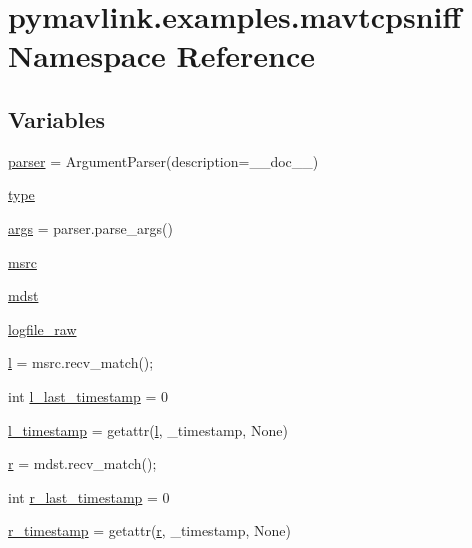 \hypertarget{namespacepymavlink_1_1examples_1_1mavtcpsniff}{}\section{pymavlink.\+examples.\+mavtcpsniff Namespace Reference}
\label{namespacepymavlink_1_1examples_1_1mavtcpsniff}
\subsection*{Variables}
\begin{DoxyCompactItemize}
\item 
\mbox{\hyperlink{namespacepymavlink_1_1examples_1_1mavtcpsniff_ad940e3269568b6625c9ab6ee1759ff71}{parser}} = Argument\+Parser(description=\+\_\+\+\_\+doc\+\_\+\+\_\+)
\item 
\mbox{\hyperlink{namespacepymavlink_1_1examples_1_1mavtcpsniff_ae675c6bc45c6b431a36251a691509f5e}{type}}
\item 
\mbox{\hyperlink{namespacepymavlink_1_1examples_1_1mavtcpsniff_a0ad33c6c70d40c78cfbcb6da67f6fe89}{args}} = parser.\+parse\+\_\+args()
\item 
\mbox{\hyperlink{namespacepymavlink_1_1examples_1_1mavtcpsniff_ac9d50620364a4c08daadfe49a1acbb0d}{msrc}}
\item 
\mbox{\hyperlink{namespacepymavlink_1_1examples_1_1mavtcpsniff_a7574d37d3c8cf95c5f4833e889b5bc82}{mdst}}
\item 
\mbox{\hyperlink{namespacepymavlink_1_1examples_1_1mavtcpsniff_aeb3d6543641bd44719e19f2fdd3badc0}{logfile\+\_\+raw}}
\item 
\mbox{\hyperlink{namespacepymavlink_1_1examples_1_1mavtcpsniff_a310417b77149af2ebfa7d55cdfebce43}{l}} = msrc.\+recv\+\_\+match();
\item 
int \mbox{\hyperlink{namespacepymavlink_1_1examples_1_1mavtcpsniff_a2d1e873c3fd312f8dddb019f9099e0dd}{l\+\_\+last\+\_\+timestamp}} = 0
\item 
\mbox{\hyperlink{namespacepymavlink_1_1examples_1_1mavtcpsniff_ae6dab03b22f9c8b60bcd8eda49c01aee}{l\+\_\+timestamp}} = getattr(\mbox{\hyperlink{namespacepymavlink_1_1examples_1_1mavtcpsniff_a310417b77149af2ebfa7d55cdfebce43}{l}}, \textquotesingle{}\+\_\+timestamp\textquotesingle{}, None)
\item 
\mbox{\hyperlink{namespacepymavlink_1_1examples_1_1mavtcpsniff_ac95233adb6f5bcb5198de3ac5149983a}{r}} = mdst.\+recv\+\_\+match();
\item 
int \mbox{\hyperlink{namespacepymavlink_1_1examples_1_1mavtcpsniff_ae9c1681b1baa25c1396eb5504141c086}{r\+\_\+last\+\_\+timestamp}} = 0
\item 
\mbox{\hyperlink{namespacepymavlink_1_1examples_1_1mavtcpsniff_ae2380478b63eddb15d96696d8e664ba1}{r\+\_\+timestamp}} = getattr(\mbox{\hyperlink{namespacepymavlink_1_1examples_1_1mavtcpsniff_ac95233adb6f5bcb5198de3ac5149983a}{r}}, \textquotesingle{}\+\_\+timestamp\textquotesingle{}, None)
\end{DoxyCompactItemize}


